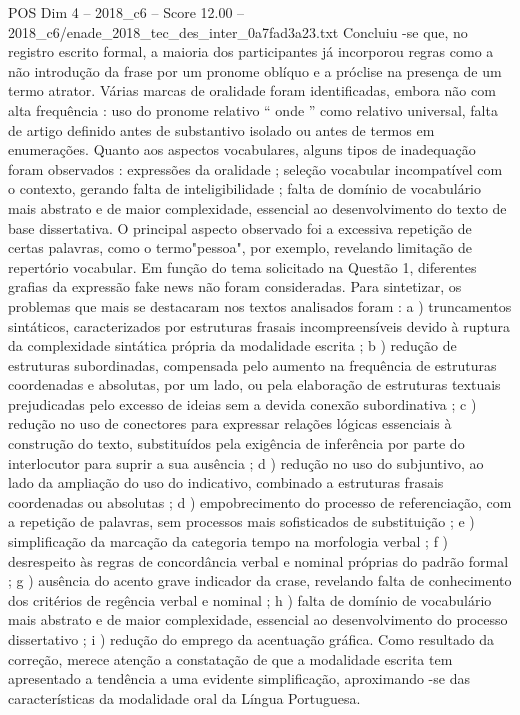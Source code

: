 \begin{textsample}{POS Dim 4 – 2018\_c6 – Score 12.00 – 2018\_c6/enade\_2018\_tec\_des\_inter\_0a7fad3a23.txt}
Concluiu -se que, no registro escrito formal, a maioria dos participantes já incorporou regras como a não introdução da frase por um pronome oblíquo e a próclise na presença de um termo atrator.
Várias marcas de oralidade foram identificadas, embora não com alta frequência : uso do pronome relativo “ onde ” como relativo universal, falta de artigo definido antes de substantivo isolado ou antes de termos em enumerações.
Quanto aos aspectos vocabulares, alguns tipos de inadequação foram observados : expressões da oralidade ; seleção vocabular incompatível com o contexto, gerando falta de inteligibilidade ; falta de domínio de vocabulário mais abstrato e de maior complexidade, essencial ao desenvolvimento do texto de base dissertativa.
O principal aspecto observado foi a excessiva repetição de certas palavras, como o termo"pessoa", por exemplo, revelando limitação de repertório vocabular.
Em função do tema solicitado na Questão 1, diferentes grafias da expressão fake news não foram consideradas.
Para sintetizar, os problemas que mais se destacaram nos textos analisados foram : a ) truncamentos sintáticos, caracterizados por estruturas frasais incompreensíveis devido à ruptura da complexidade sintática própria da modalidade escrita ; b ) redução de estruturas subordinadas, compensada pelo aumento na frequência de estruturas coordenadas e absolutas, por um lado, ou pela elaboração de estruturas textuais prejudicadas pelo excesso de ideias sem a devida conexão subordinativa ; c ) redução no uso de conectores para expressar relações lógicas essenciais à construção do texto, substituídos pela exigência de inferência por parte do interlocutor para suprir a sua ausência ; d ) redução no uso do subjuntivo, ao lado da ampliação do uso do indicativo, combinado a estruturas frasais coordenadas ou absolutas ; d ) empobrecimento do processo de referenciação, com a repetição de palavras, sem processos mais sofisticados de substituição ; e ) simplificação da marcação da categoria tempo na morfologia verbal ; f ) desrespeito às regras de concordância verbal e nominal próprias do padrão formal ; g ) ausência do acento grave indicador da crase, revelando falta de conhecimento dos critérios de regência verbal e nominal ; h ) falta de domínio de vocabulário mais abstrato e de maior complexidade, essencial ao desenvolvimento do processo dissertativo ; i ) redução do emprego da acentuação gráfica.
Como resultado da correção, merece atenção a constatação de que a modalidade escrita tem apresentado a tendência a uma evidente simplificação, aproximando -se das características da modalidade oral da Língua Portuguesa.

\end{textsample}
